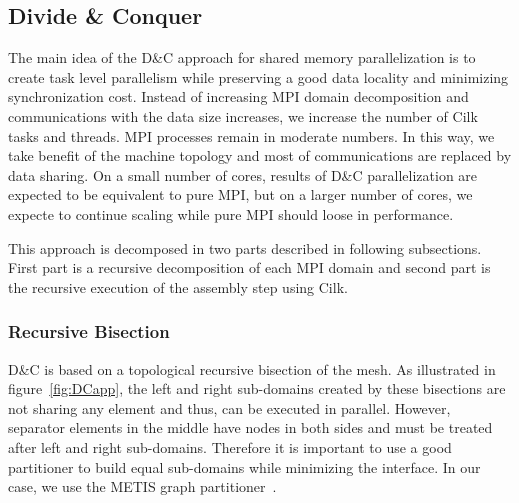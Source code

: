 \documentclass{IOS-Book-Article}
\begin{document}
\subsection{Divide \& Conquer}
%

The main idea of the D\&C approach for shared memory parallelization is to create task level parallelism while preserving a good data locality and minimizing synchronization cost.
Instead of increasing MPI domain decomposition and communications with the data size increases, we increase the number of Cilk tasks and threads. MPI processes remain in moderate numbers.
In this way, we take benefit of the machine topology and most of communications are replaced by data sharing.
On a small number of cores, results of D\&C parallelization are expected to be equivalent to pure MPI, but on a larger number of cores, we expecte to continue scaling while pure MPI should loose in performance.

This approach is decomposed in two parts described in following subsections.
First part is a recursive decomposition of each MPI domain and second part is the recursive execution of the assembly step using Cilk.

\subsubsection{Recursive Bisection}
\label{sec:DCrec}
D\&C is based on a topological recursive bisection of the mesh.
As illustrated in figure~\ref{fig:DCapp}, the left and right sub-domains created by these bisections are not sharing any element and thus, can be executed in parallel.
However, separator elements in the middle have nodes in both sides and must be treated after left and right sub-domains.
Therefore it is important to use a good partitioner to build equal sub-domains while minimizing the interface. In our case, we use the METIS graph partitioner~\cite{Metis}.
\end{document}
